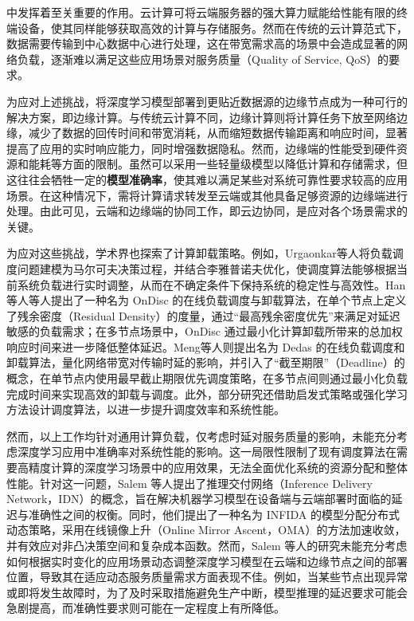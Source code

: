 中发挥着至关重要的作用。云计算可将云端服务器的强大算力赋能给性能有限的终端设备，使其同样能够获取高效的计算与存储服务\cite{shafi20175g}。然而在传统的云计算范式下，数据需要传输到中心数据中心进行处理，这在带宽需求高的场景中会造成显著的网络负载，逐渐难以满足这些应用场景对服务质量（Quality of Service, QoS）的要求\cite{wang2024end}。


为应对上述挑战，将深度学习模型部署到更贴近数据源的边缘节点成为一种可行的解决方案，即边缘计算。与传统云计算不同，边缘计算则将计算任务下放至网络边缘，减少了数据的回传时间和带宽消耗，从而缩短数据传输距离和响应时间，显著提高了应用的实时响应能力，同时增强数据隐私\cite{chowdhury2019co,khan2019edge,liu2019survey,施巍松2019边缘计算,刘通2021边缘计算中任务卸载研究综述}。然而，边缘端的性能受到硬件资源和能耗等方面的限制。虽然可以采用一些轻量级模型以降低计算和存储需求，但这往往会牺牲一定的\textbf{模型准确率}，使其难以满足某些对系统可靠性要求较高的应用场景。在这种情况下，需将计算请求转发至云端或其他具备足够资源的边缘端进行处理。由此可见，云端和边缘端的协同工作，即云边协同，是应对各个场景需求的关键。




为应对这些挑战，学术界也探索了计算卸载策略。例如，Urgaonkar等人\cite{urgaonkar2015dynamic}将负载调度问题建模为马尔可夫决策过程，并结合李雅普诺夫优化，使调度算法能够根据当前系统负载进行实时调整，从而在不确定条件下保持系统的稳定性与高效性。Han 等人\cite{han2019ondisc}等人提出了一种名为 OnDisc 的在线负载调度与卸载算法，在单个节点上定义了残余密度（Residual Density）的度量，通过“最高残余密度优先”来满足对延迟敏感的负载需求；在多节点场景中，OnDisc 通过最小化计算卸载所带来的总加权响应时间来进一步降低整体延迟。Meng等人\cite{meng2019online}则提出名为 Dedas 的在线负载调度和卸载算法，量化网络带宽对传输时延的影响，并引入了“截至期限”（Deadline）的概念，在单节点内使用最早截止期限优先调度策略，在多节点间则通过最小化负载完成时间来实现高效的卸载与调度。此外，部分研究\cite{崔玉亚2021一种面向移动边缘计算的多用户细粒度任务卸载调度方法,邝祝芳2022基于深度强化学习的多用户边缘计算任务卸载调度与资源分配算法,郑守建2022一种基于综合匹配度的边缘计算系统任务调度方法,张斐斐2023边缘计算中协作计算卸载与动态任务调度}还借助启发式策略或强化学习方法设计调度算法，以进一步提升调度效率和系统性能。

然而，以上工作均针对通用计算负载，仅考虑时延对服务质量的影响，未能充分考虑深度学习应用中准确率对系统性能的影响。这一局限性限制了现有调度算法在需要高精度计算的深度学习场景中的应用效果，无法全面优化系统的资源分配和整体性能。针对这一问题，Salem 等人\cite{salem2023toward}提出了推理交付网络（Inference Delivery Network，IDN）的概念，旨在解决机器学习模型在设备端与云端部署时面临的延迟与准确性之间的权衡。同时，他们提出了一种名为 INFIDA 的模型分配分布式动态策略，采用在线镜像上升（Online Mirror Ascent，OMA）的方法加速收敛，并有效应对非凸决策空间和复杂成本函数。然而，Salem 等人的研究未能充分考虑如何根据实时变化的应用场景动态调整深度学习模型在云端和边缘节点之间的部署位置，导致其在适应动态服务质量需求方面表现不佳。例如，当某些节点出现异常或即将发生故障时，为了及时采取措施避免生产中断，模型推理的延迟要求可能会急剧提高，而准确性要求则可能在一定程度上有所降低。


